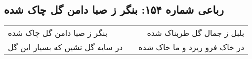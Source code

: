 \begin{center}
\section*{رباعی شماره ۱۵۴: بنگر ز صبا دامن گل چاک شده}
\label{sec:sh154}
\begin{longtable}{l p{0.5cm} r}
بنگر ز صبا دامن گل چاک شده
&&
بلبل ز جمال گل طربناک شده
\\
در سایه گل نشین که بسیار این گل
&&
در خاک فرو ریزد و ما خاک شده
\\
\end{longtable}
\end{center}
